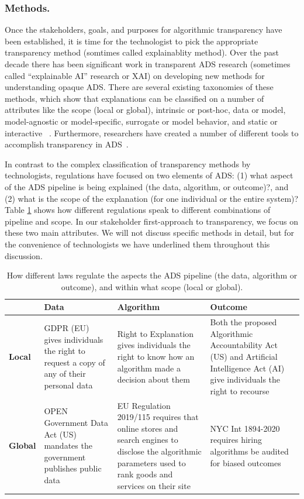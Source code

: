 \subsubsection{Methods.}  Once the stakeholders, goals, and purposes for algorithmic transparency have been established, it is time for the technologist to pick the appropriate transparency method (somtimes called explainablity method). Over the past decade there has been significant work in transparent ADS research (sometimes called ``explainable AI'' research or XAI) on developing new methods for understanding opaque ADS.  There are several existing taxonomies of these methods, which show that explanations can be classified on a number of attributes like the scope (local or global), intrinsic or post-hoc, data or model, model-agnostic or model-specific, surrogate or model behavior, and static or interactive ~\cite{DBLP:journals/jmlr/AryaBCDHHHLLMMP20, molnar2019, DBLP:journals/corr/abs-2012-01805}. Furthermore, researchers have created a number of different tools to accomplish transparency in ADS~\cite{DBLP:conf/nips/LundbergL17, ribeiro2016should, datta2016algorithmic, DBLP:journals/corr/abs-2004-00668, DBLP:journals/corr/abs-2004-00668}.

In contrast to the complex classification of transparency methods by technologists, regulations have focused on two elements of ADS: (1) what aspect of the ADS pipeline is being explained (the data, algorithm, or outcome)?, and (2) what is the scope of the explanation (for one individual or the entire system)? Table \ref{tab:laws} shows how different regulations speak to different combinations of pipeline and scope. In our stakeholder first-approach to transparency, we focus on these two main attributes. We will not discuss specific methods in detail, but for the convenience of technologists we have underlined them throughout this discussion.

\begin{table}[]
\centering
\begin{tabular}{m{}m{}m{}m{}}
\toprule
 & \bf{Data} & \bf{Algorithm} & \bf{Outcome} \\
\midrule
\multicolumn{1}{l}{\bf{Local}}  & GDPR (EU) gives individuals the right to request a copy of any of their personal data & Right to Explanation gives individuals the right to know how an algorithm made a decision about them  & Both the proposed Algorithmic Accountability Act (US) and Artificial Intelligence Act (AI) give individuals the right to recourse \\
\multicolumn{1}{l}{\bf{Global}} & OPEN Government Data Act (US) mandates the government publishes public data & EU Regulation 2019/115 requires that online stores and search engines to disclose the algorithmic parameters used to rank goods and services on their site & NYC Int 1894-2020 requires hiring algorithms be audited for biased outcomes \\
\bottomrule
\end{tabular}
\caption{How different laws regulate the aspects the ADS pipeline (the data, algorithm or outcome), and within what scope (local or global).}
\label{tab:laws}
\end{table}

